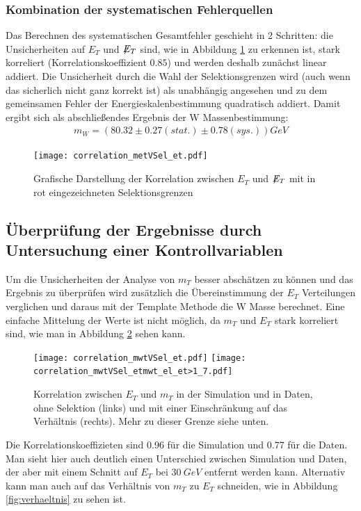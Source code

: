 \documentclass[a4paper,12pt]{article}
\newcommand{\met}{\ensuremath{\not\mathrel{E}}_T}
\begin{document}
\subsubsection*{Kombination der systematischen Fehlerquellen}
Das Berechnen des systematischen Gesamtfehler geschieht in 2 Schritten:
die Unsicherheiten auf $E_{T}$ und $\met$ sind, wie in Abbildung \ref{fig:etVSmet} zu erkennen ist, stark korreliert (Korrelationskoeffizient $0.85$)
und werden deshalb zunächst linear addiert. Die Unsicherheit durch die Wahl der Selektionsgrenzen wird (auch wenn das sicherlich nicht ganz korrekt ist)
als unabhängig angesehen und zu dem gemeinsamen Fehler der Energieskalenbestimmung quadratisch addiert. Damit ergibt sich als abschließendes Ergebnis der 
W Massenbestimmung:
\begin{align*}
	m_W = ( 80.32 ± 0.27 (stat.) ± 0.78(sys.)) \si{GeV}
\end{align*}
\begin{figure}[htb]
	\centering
	\texttt{[image: correlation\_metVSel\_et.pdf]}
	\caption{Grafische Darstellung der Korrelation zwischen $E_{T}$ und $\met$ mit in rot eingezeichneten Selektionsgrenzen}
	\label{fig:etVSmet}
\end{figure}

\subsection{Überprüfung der Ergebnisse durch Untersuchung einer Kontrollvariablen}
Um die Unsicherheiten der Analyse von $m_{T}$ besser abschätzen zu können und das Ergebnis zu überprüfen wird zusätzlich
die Übereinstimmung der $E_T$ Verteilungen verglichen und daraus mit der Template Methode die W Masse
berechnet. Eine einfache Mittelung der Werte ist nicht möglich, da $m_T$ und $E_T$ stark korreliert
sind, wie man in Abbildung \ref{fig:correlation} sehen kann.
\begin{figure}[htb]
	\centering
	\texttt{[image: correlation\_mwtVSel\_et.pdf]}
	\texttt{[image: correlation\_mwtVSel\_etmwt\_el\_et>1\_7.pdf]}
	\caption{Korrelation zwischen $E_T$ und $m_T$ in der Simulation und in Daten, ohne Selektion
	(links) und mit einer Einschränkung auf das Verhältnis (rechts). Mehr zu dieser Grenze siehe
	unten.}
	\label{fig:correlation}
\end{figure}


Die Korrelationskoeffizieten sind 0.96 für die Simulation und 0.77 für die Daten. Man sieht hier
auch deutlich einen Unterschied  zwischen Simulation und Daten, der aber mit einem Schnitt auf $E_T$ bei
$\SI{30}{GeV}$ entfernt werden kann. Alternativ kann man auch auf das Verhältnis von $m_T$ zu $E_T$
schneiden, wie in Abbildung \ref{fig:verhaeltnis} zu sehen ist.
\end{document}
